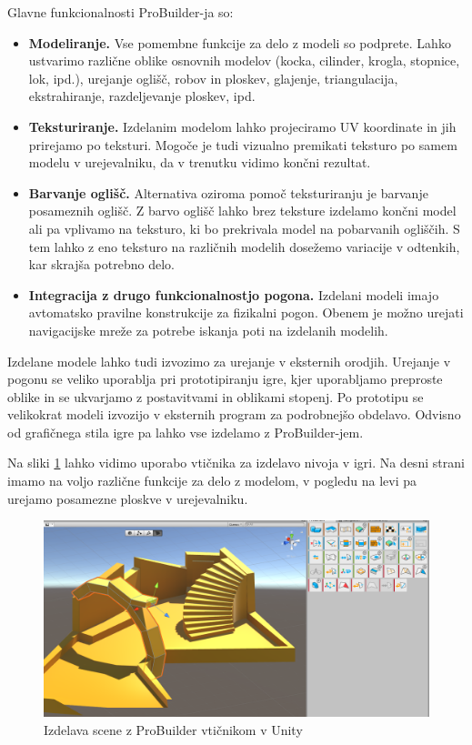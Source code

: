 \documentclass[12pt,a4paper,twoside]{book}
\begin{document}
Glavne funkcionalnosti ProBuilder-ja so:
\begin{itemize}
\item \textbf{Modeliranje.} Vse pomembne funkcije za delo z modeli so podprete. Lahko ustvarimo različne oblike osnovnih modelov (kocka, cilinder, krogla, stopnice, lok, ipd.), urejanje oglišč, robov in ploskev, glajenje, triangulacija, ekstrahiranje, razdeljevanje ploskev, ipd.
\item \textbf{Teksturiranje.} Izdelanim modelom lahko projeciramo UV koordinate in jih prirejamo po teksturi. Mogoče je tudi vizualno premikati teksturo po samem modelu v urejevalniku, da v trenutku vidimo končni rezultat.
\item \textbf{Barvanje oglišč.} Alternativa oziroma pomoč teksturiranju je barvanje posameznih oglišč. Z barvo oglišč lahko brez teksture izdelamo končni model ali pa vplivamo na teksturo, ki bo prekrivala model na pobarvanih ogliščih. S tem lahko z eno teksturo na različnih modelih dosežemo variacije v odtenkih, kar skrajša potrebno delo.
\item \textbf{Integracija z drugo funkcionalnostjo pogona.} Izdelani modeli imajo avtomatsko pravilne konstrukcije za fizikalni pogon. Obenem je možno urejati navigacijske mreže za potrebe iskanja poti na izdelanih modelih.
\end{itemize}

Izdelane modele lahko tudi izvozimo za urejanje v eksternih orodjih. Urejanje v pogonu se veliko uporablja pri prototipiranju igre, kjer uporabljamo preproste oblike in se ukvarjamo z postavitvami in oblikami stopenj. Po prototipu se velikokrat modeli izvozijo v eksternih program za podrobnejšo obdelavo. Odvisno od grafičnega stila igre pa lahko vse izdelamo z ProBuilder-jem. 

Na sliki \ref{slika:probuilder} lahko vidimo uporabo vtičnika za izdelavo nivoja v igri. Na desni strani imamo na voljo različne funkcije za delo z modelom, v pogledu na levi pa urejamo posamezne ploskve v urejevalniku.

\begin{figure}[h]
	\centering
	\includegraphics[width=15cm]{probuilder}
	\caption{Izdelava scene z ProBuilder vtičnikom v Unity}
	\label{slika:probuilder}
\end{figure}
\end{document}
